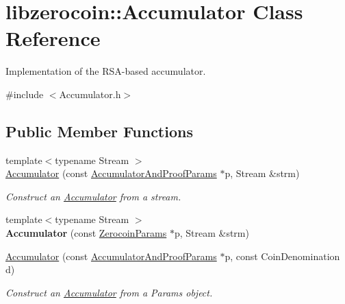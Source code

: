\hypertarget{classlibzerocoin_1_1_accumulator}{}\section{libzerocoin\+::Accumulator Class Reference}
\label{classlibzerocoin_1_1_accumulator}


Implementation of the R\+S\+A-\/based accumulator.  




{\ttfamily \#include $<$Accumulator.\+h$>$}

\subsection*{Public Member Functions}
\begin{DoxyCompactItemize}
\item 
{\footnotesize template$<$typename Stream $>$ }\\\mbox{\hyperlink{classlibzerocoin_1_1_accumulator_a215f60913d092b292e753b83da226723}{Accumulator}} (const \mbox{\hyperlink{classlibzerocoin_1_1_accumulator_and_proof_params}{Accumulator\+And\+Proof\+Params}} $\ast$p, Stream \&strm)
\begin{DoxyCompactList}\small\item\em Construct an \mbox{\hyperlink{classlibzerocoin_1_1_accumulator}{Accumulator}} from a stream. \end{DoxyCompactList}\item 
\mbox{\label{classlibzerocoin_1_1_accumulator_acde0e69159349a5af1e50e0ab808b8a5}} 
{\footnotesize template$<$typename Stream $>$ }\\{\bfseries Accumulator} (const \mbox{\hyperlink{classlibzerocoin_1_1_zerocoin_params}{Zerocoin\+Params}} $\ast$p, Stream \&strm)
\item 
\mbox{\hyperlink{classlibzerocoin_1_1_accumulator_ab50daca64cafc7b8e304e173b4988a29}{Accumulator}} (const \mbox{\hyperlink{classlibzerocoin_1_1_accumulator_and_proof_params}{Accumulator\+And\+Proof\+Params}} $\ast$p, const Coin\+Denomination d)
\begin{DoxyCompactList}\small\item\em Construct an \mbox{\hyperlink{classlibzerocoin_1_1_accumulator}{Accumulator}} from a Params object. \end{DoxyCompactList}\item 
\mbox{\label{classlibzerocoin_1_1_accumulator_ae69c62cdef1144ad1fd7d5012f120579}} 

\end{DoxyCompactItemize}
